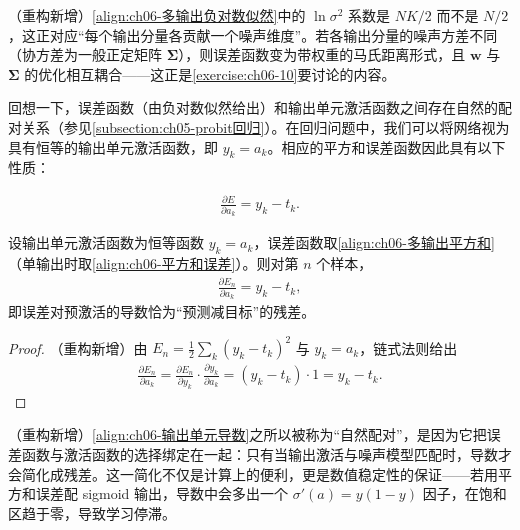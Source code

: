 \documentclass[../../main.tex]{subfiles}
\begin{document}
\begin{remark}（重构新增）\eqref{align:ch06-多输出负对数似然}中的 $\ln\sigma^{2}$ 系数是 $NK/2$ 而不是 $N/2$，这正对应“每个输出分量各贡献一个噪声维度”。若各输出分量的噪声方差不同（协方差为一般正定矩阵 $\boldsymbol{\Sigma}$），则误差函数变为带权重的马氏距离形式，且 $\boldsymbol{w}$ 与 $\boldsymbol{\Sigma}$ 的优化相互耦合——这正是\cref{exercise:ch06-10}要讨论的内容。
\end{remark}

回想一下，误差函数（由负对数似然给出）和输出单元激活函数之间存在自然的配对关系（参见\cref{subsection:ch05-probit回归}）。在回归问题中，我们可以将网络视为具有恒等的输出单元激活函数，即 $y_k=a_k$。相应的平方和误差函数因此具有以下性质：

\begin{align}
\frac{\partial E}{\partial a_k}=y_k-t_k.
\label{align:ch06-输出单元导数}
\end{align}

\begin{proposition}[恒等输出单元的误差导数]\label{proposition:ch06-恒等输出导数}
设输出单元激活函数为恒等函数 $y_k=a_k$，误差函数取\eqref{align:ch06-多输出平方和}（单输出时取\eqref{align:ch06-平方和误差}）。则对第 $n$ 个样本，
\begin{align}
\frac{\partial E_n}{\partial a_k}=y_k-t_k,
\label{align:ch06-恒等输出导数}
\end{align}
即误差对预激活的导数恰为“预测减目标”的残差。
\end{proposition}

\begin{proof}
（重构新增）由 $E_n=\frac{1}{2}\sum_{k}(y_k-t_k)^{2}$ 与 $y_k=a_k$，链式法则给出
\begin{align}
\frac{\partial E_n}{\partial a_k}=\frac{\partial E_n}{\partial y_k}\cdot\frac{\partial y_k}{\partial a_k}=(y_k-t_k)\cdot1=y_k-t_k.
\end{align}
\end{proof}

\begin{remark}（重构新增）\eqref{align:ch06-输出单元导数}之所以被称为“自然配对”，是因为它把误差函数与激活函数的选择绑定在一起：只有当输出激活与噪声模型匹配时，导数才会简化成残差。这一简化不仅是计算上的便利，更是数值稳定性的保证——若用平方和误差配 sigmoid 输出，导数中会多出一个 $\sigma'(a)=y(1-y)$ 因子，在饱和区趋于零，导致学习停滞。
\end{remark}
\end{document}
